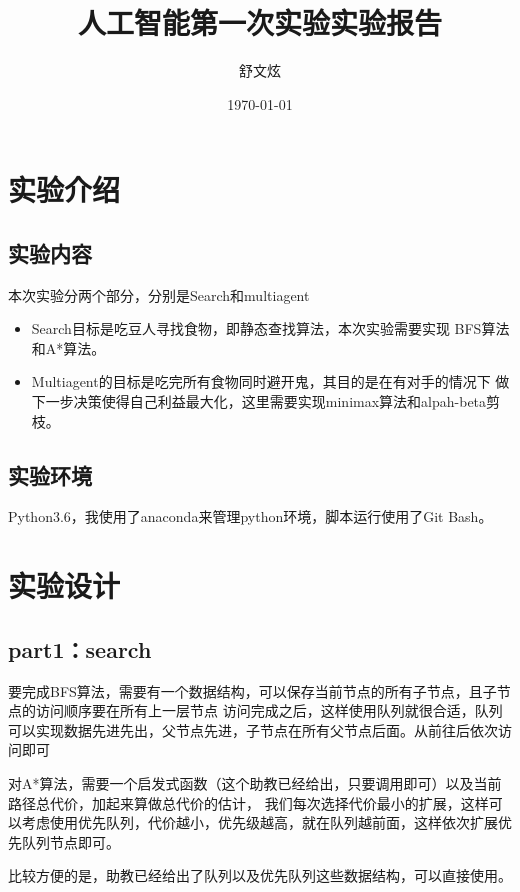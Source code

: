 \documentclass{report}
\title{人工智能第一次实验实验报告}
\author{舒文炫}
\date{\today}
\begin{document}
    \maketitle
    \tableofcontents
    \chapter{实验介绍}
    \section{实验内容}
    本次实验分两个部分，分别是Search和multiagent
    \begin{itemize}
        \item Search目标是吃豆人寻找食物，即静态查找算法，本次实验需要实现
        BFS算法和A*算法。
        \item Multiagent的目标是吃完所有食物同时避开鬼，其目的是在有对手的情况下
        做下一步决策使得自己利益最大化，这里需要实现minimax算法和alpah-beta剪枝。
    \end{itemize}
    \section{实验环境}
    Python3.6，我使用了anaconda来管理python环境，脚本运行使用了Git Bash。
    \chapter{实验设计}
    \section{part1：search}
    要完成BFS算法，需要有一个数据结构，可以保存当前节点的所有子节点，且子节点的访问顺序要在所有上一层节点
    访问完成之后，这样使用队列就很合适，队列可以实现数据先进先出，父节点先进，子节点在所有父节点后面。从前往后依次访问即可\par 
    对A*算法，需要一个启发式函数（这个助教已经给出，只要调用即可）以及当前路径总代价，加起来算做总代价的估计，
    我们每次选择代价最小的扩展，这样可以考虑使用优先队列，代价越小，优先级越高，就在队列越前面，这样依次扩展优先队列节点即可。\par 
    比较方便的是，助教已经给出了队列以及优先队列这些数据结构，可以直接使用。
\end{document}
